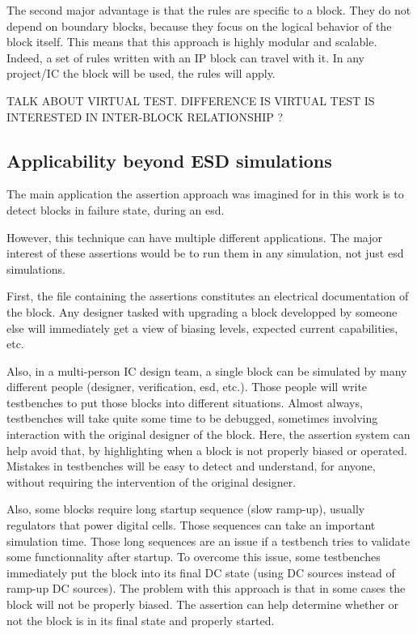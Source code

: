 The second major advantage is that the rules are specific to a block.
They do not depend on boundary blocks, because they focus on the logical behavior of the block itself.
This means that this approach is highly modular and scalable.
Indeed, a set of rules written with an IP block can travel with it.
In any project/IC the block will be used, the rules will apply.

TALK ABOUT VIRTUAL TEST. DIFFERENCE IS VIRTUAL TEST IS INTERESTED IN INTER-BLOCK RELATIONSHIP ?

\subsection{Applicability beyond ESD simulations}

The main application the assertion approach was imagined for in this work is to detect blocks in failure state,
during an \gls{esd}.

However, this technique can have multiple different applications.
The major interest of these assertions would be to run them in any simulation, not just \gls{esd} simulations.

First, the file containing the assertions constitutes an electrical documentation of the block.
Any designer tasked with upgrading a block developped by someone else will immediately get a view of biasing levels,
expected current capabilities, etc.

Also, in a multi-person IC design team, a single block can be simulated by many different people (designer, verification, esd, etc.).
Those people will write testbenches to put those blocks into different situations.
Almost always, testbenches will take quite some time to be debugged, sometimes involving interaction with the original designer of the block.
Here, the assertion system can help avoid that, by highlighting when a block is not properly biased or operated.
Mistakes in testbenches will be easy to detect and understand, for anyone, without requiring the intervention of the original designer.

Also, some blocks require long startup sequence (slow ramp-up), usually regulators that power digital cells.
Those sequences can take an important simulation time.
Those long sequences are an issue if a testbench tries to validate some functionnality after startup.
To overcome this issue, some testbenches immediately put the block into its final DC state (using DC sources instead of ramp-up DC sources).
The problem with this approach is that in some cases the block will not be properly biased.
The assertion can help determine whether or not the block is in its final state and properly started.

